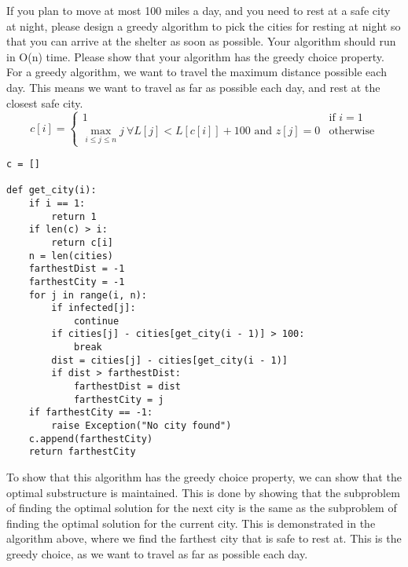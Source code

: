 \documentclass[a4paper,12pt]{article}
\begin{document}
If you plan to move at most 100 miles a day, and you need to rest at a safe city
at night, please design a greedy algorithm to pick the cities for resting at
night so that you can arrive at the shelter as soon as possible. Your algorithm
should run in O(n) time. Please show that your algorithm has the greedy choice
property.
\\[1em]
For a greedy algorithm, we want to travel the maximum distance possible each
day. This means we want to travel as far as possible each day, and rest at the
closest safe city. \\[1em]

\begin{equation*}
  c[i] = \begin{cases}
    1                                                                            & \text{if } i = 1 \\
    \max_{i \leq j \leq n} j\ \forall L[j] < L[c[i]] + 100 \text{ and } z[j] = 0 & \text{otherwise}
  \end{cases}
\end{equation*}

\begin{verbatim}
c = []

def get_city(i):
    if i == 1:
        return 1
    if len(c) > i:
        return c[i]
    n = len(cities)
    farthestDist = -1
    farthestCity = -1
    for j in range(i, n):
        if infected[j]:
            continue
        if cities[j] - cities[get_city(i - 1)] > 100:
            break
        dist = cities[j] - cities[get_city(i - 1)]
        if dist > farthestDist:
            farthestDist = dist
            farthestCity = j
    if farthestCity == -1:
        raise Exception("No city found")
    c.append(farthestCity)
    return farthestCity
\end{verbatim}

To show that this algorithm has the greedy choice property, we can show that
the optimal substructure is maintained. This is done by showing that the
subproblem of finding the optimal solution for the next city is the same as the
subproblem of finding the optimal solution for the current city. This is
demonstrated in the algorithm above, where we find the farthest city that is
safe to rest at. This is the greedy choice, as we want to travel as far as
possible each day.
\end{document}
